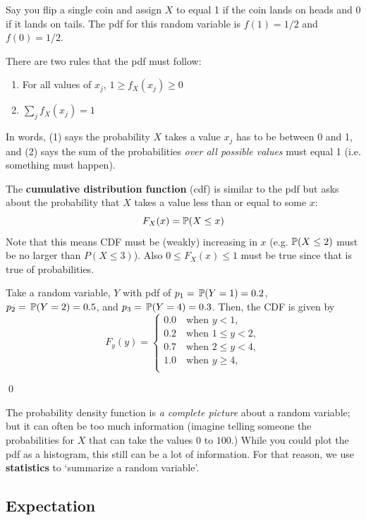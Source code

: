 \documentclass[12pt]{article}
\begin{document}
\begin{example}
  Say you flip a single coin and assign $X$ to equal 1 if the coin lands on heads and 0 if it lands on tails. The pdf for this random variable is $f(1) = 1/2$ and $f(0) = 1/2$.
\end{example}

There are two rules that the pdf must follow:
\begin{enumerate}
  \item For all values of $x_j$, $1 \geq f_{X}(x_j) \geq 0$ 
  \item $\sum_{j} f_{X}(x_j) = 1$
\end{enumerate}
In words, (1) says the probability $X$ takes a value $x_j$ has to be between 0 and 1, and (2) says the sum of the probabilities \emph{over all possible values} must equal 1 (i.e. something must happen).


The \textbf{cumulative distribution function} (cdf) is similar to the pdf but asks about the probability that $X$ takes a value less than or equal to some $x$:
$$
  F_{X}(x) = \P(X \leq x)
$$
Note that this means CDF must be (weakly) increasing in $x$ (e.g. $\P(X \leq 2)$ must be no larger than $P(X \leq 3)$). Also $0 \leq F_{X}(x) \leq 1$ must be true since that is true of probabilities.

\begin{example}
  Take a random variable, $Y$ with pdf of $p_1 = \P{Y = 1} = 0.2$, $p_2 = \P{Y = 2} = 0.5$, and $p_3 = \P{Y = 4} = 0.3$. Then, the CDF is given by 
  $$
    F_{y}(y) = \begin{cases}
      0.0   \quad \text{when } y < 1, \\
      0.2 \quad \text{when } 1 \leq y < 2, \\
      0.7 \quad \text{when } 2 \leq y < 4, \\
      1.0   \quad \text{when } y \geq 4, \\
    \end{cases}
  $$

  \qed
\end{example}

The probability density function is \emph{a complete picture} about a random variable; but it can often be too much information (imagine telling someone the probabilities for $X$ that can take the values $0$ to $100$.) While you could plot the pdf as a histogram, this still can be a lot of information. For that reason, we use \textbf{statistics} to `summarize a random variable'. 

\subsection*{Expectation}
\end{document}
